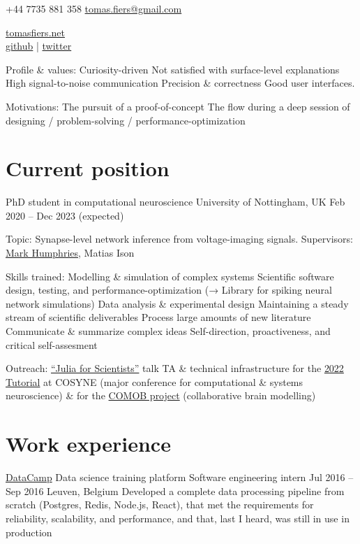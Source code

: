 \documentclass[a4]{article}
\author{Tomas Fiers}
\makeatletter
\def\email{tomas.fiers@gmail.com}
\def\phoneUK{+44 7735 881 358}
\def\phone{\phoneUK}
\def\website{tomasfiers.net}
\def\github{tfiers}
\def\twitter{TomasFiers}
\makeatother
\begin{document}
{\large\phone}
\href{mailto:\email}{\email}

\makeatletter  %
{\huge\@author}
\makeatother

\href{https://\website}{\large \website} \\
\href{https://github.com/\github}{github} |
\href{https://twitter.com/\twitter}{twitter}


Profile \& values:
Curiosity-driven
Not satisfied with surface-level explanations
High signal-to-noise communication
Precision \& correctness
Good user interfaces.

Motivations:
The pursuit of a proof-of-concept
The flow  during a deep session of designing / problem-solving / performance-optimization


\section{Current position}

PhD student in computational neuroscience
University of Nottingham, UK
Feb 2020  –  Dec  2023  (expected)

Topic:  Synapse-level network inference from voltage-imaging signals.
Supervisors:  \href{https://humphries-lab.org}{Mark Humphries}, Matias Ison

Skills trained:
Modelling \& simulation of complex systems
Scientific software design, testing, and performance-optimization (→ Library for spiking neural network simulations)
Data analysis \& experimental design
Maintaining a steady stream of scientific deliverables
Process large amounts of new literature
Communicate \& summarize complex ideas
Self-direction, proactiveness, and critical self-assesment

Outreach:
\href{https://tomasfiers.net/posts/julia-for-scientists}{``Julia for Scientists''} talk
TA \& technical infrastructure for the \href{https://github.com/neural-reckoning/cosyne-tutorial-2022}{2022 Tutorial} at COSYNE (major conference for computational \& systems neuroscience) \& for the \href{https://comob-project.github.io}{COMOB project} (collaborative brain modelling)


\section{Work experience}

\href{https://www.datacamp.com}{DataCamp}
Data science training platform
Software engineering intern
Jul 2016  –  Sep 2016
Leuven, Belgium
Developed a complete data processing pipeline from scratch (Postgres, Redis, Node.js, React), that met the requirements for reliability, scalability, and performance, and that, last I heard, was still in use in production
\end{document}
